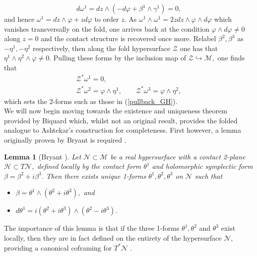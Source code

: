 \documentclass[a4paper,12pt, onecolumn, notitlepage]{article}
\newtheorem{lem}[thm]{Lemma}
\theoremstyle{definition}
\theoremstyle{remark}
\newcommand{\w}{\omega}
\newcommand{\vp}{\varphi}
\begin{document}
\begin{equation*}
	d\w^{1}	= dz\wedge (-d\varphi + \beta^{1}\wedge\gamma^{1})
	= 0,
\end{equation*}
and hence $\w^{1} = dz\wedge\varphi + zd\varphi$ to order $z.$ As $\w^{1}\wedge\w^{1} = 2zdz\wedge\varphi\wedge d\varphi$ which vanishes transversally on the fold, one arrives back at the condition $\varphi\wedge d\varphi\neq 0$ along $z=0$ and the contact structure is recovered once more. Relabel $\beta^{2},\beta^{3}$ as $-\eta^{1}, -\eta^{2}$ respectively, then along the fold hypersurface $\mathcal{Z}$ one has that $\eta^{1}\wedge\eta^{2}\wedge\vp\neq 0.$ Pulling these forms by the inclusion map of $\mathcal{Z}\hookrightarrow\mathcal{M},$ one finds that
\begin{gather}
	\mathcal{Z}^{\ast}\w^{1} = 0,\nonumber\\
	\label{k_pullbacks}
	\mathcal{Z}^{\ast}\w^{2} = \vp\wedge\eta^{1},\qquad \mathcal{Z}^{\ast}\w^{3} = \vp\wedge\eta^{2},
\end{gather}
which sets the 2-forms such as those in (\ref{pullback_GH}).\\
We will now begin moving towards the existence and uniqueness theorem provided by Biquard which, whilst not an original result, provides the folded analogue to Ashtekar's construction for completeness. First however, a lemma originally proven by Bryant is required \cite{bryant_2004}.\\

\begin{lem}[Bryant \cite{bryant_2004}]
	\label{bryant}
	Let $\mathcal{N}\subset\mathcal{M}$ be a real hypersurface with a contact 2-plane $\mathcal{H}\subset T\mathcal{N},$ defined locally by the contact form $\theta^{1}$ and holomorphic symplectic form $\beta = \beta^{2} + i\beta^{3}.$ Then there exists unique 1-forms $\theta^{1},\theta^{2},\theta^{3}$ on $\mathcal{N}$ such that
	\begin{itemize}
		\item $\beta = \theta^{1}\wedge(\theta^{2}+i\theta^{3}),$ and
		\item $d\theta^{1}=i(\theta^{2}+i\theta^{3})\wedge (\theta^{2}-i\theta^{3}).$\\
	\end{itemize}
\end{lem}
The importance of this lemma is that if the three 1-forms $\theta^{1},\theta^{2}$ and $\theta^{3}$ exist locally, then they are in fact defined on the entirety of the hypersurface $\mathcal{N},$ providing a canonical coframing for $T^{\ast}\mathcal{N}$ \cite{bryant_2004}.\\
\end{document}
